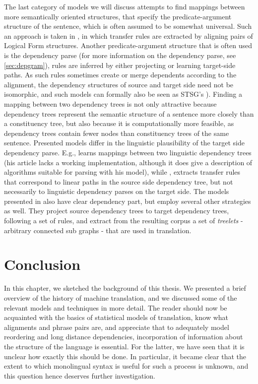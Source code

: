 The last category of models we will discuss attempts to find mappings between more semantically oriented structures, that specify the predicate-argument structure of the sentence, which is often assumed to be somewhat universal. Such an approach is taken in \cite{menezes2003best}, in which transfer rules are extracted by aligning pairs of Logical Form structures. Another predicate-argument structure that is often used is the dependency parse (for more information on the dependency parse, see \ref{sec:depgram}), rules are inferred by either projecting or learning target-side paths. As such rules sometimes create or merge dependents according to the alignment, the dependency structures of source and target side need not be isomorphic, and such models can formally also be seen as STSG's \citep[as made explicit in][]{eisner2003learning}). Finding a mapping between two dependency trees is not only attractive because dependency trees represent the semantic structure of a sentence more closely than a constituency tree, but also because it is computationally more feasible, as dependency trees contain fewer nodes than constituency trees of the same sentence. Presented models differ in the linguistic plausibility of the target side dependency parse. E.g., \cite{eisner2003learning} learns mappings between two linguistic dependency trees (his article lacks a working implementation, although it does give a description of algorithms suitable for parsing with his model), while \cite{lin2004path}, extracts transfer rules that correspond to linear paths in the source side dependency tree, but not necessarily to linguistic dependency parses on the target side. The models presented in \cite{quirk2005dependency,quirk2006dependency,quirk2006we} also have clear dependency part, but employ several other strategies as well. They project source dependency trees to target dependency trees, following a set of rules, and extract from the resulting corpus a set of \textit{treelets} - arbitrary connected sub graphs - that are used in translation.

\section{Conclusion}
\label{sec:conclusion}

In this chapter, we sketched the background of this thesis. We presented a brief overview of the history of machine translation, and we discussed some of the relevant models and techniques in more detail. The reader should now be acquainted with the basics of statistical models of translation, know what alignments and phrase pairs are, and appreciate that to adequately model reordering and long distance dependencies, incorporation of information about the structure of the language is essential. For the latter, we have seen that it is unclear how exactly this should be done. In particular, it became clear that the extent to which monolingual syntax is useful for such a process is unknown, and this question hence deserves further investigation.